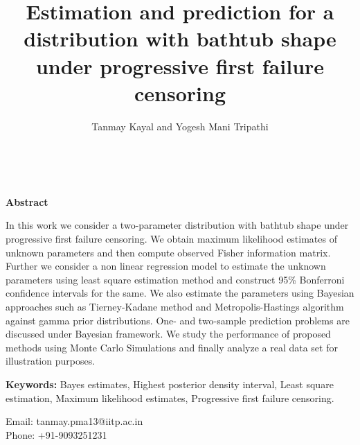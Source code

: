 \documentclass{article}
\begin{document}
\vspace{5cm}
\title
{\bf Estimation and prediction for a distribution with bathtub shape under progressive first failure censoring}

\author{Tanmay Kayal and Yogesh Mani Tripathi}
\date{}
\maketitle {}\\

 
 \begin{center}
 {\bf Abstract}
 \end{center}


In this work we consider a two-parameter distribution with bathtub shape under progressive first failure censoring. We obtain maximum likelihood estimates of unknown parameters and then compute observed Fisher information matrix. Further we consider a non linear regression model to estimate the unknown parameters using least square estimation method and construct 95\% Bonferroni confidence intervals for the same. We also estimate the parameters using Bayesian approaches such as Tierney-Kadane method and Metropolis-Hastings algorithm against gamma prior distributions. One- and two-sample prediction problems are discussed under Bayesian framework. We study the performance of proposed methods using Monte Carlo Simulations and finally analyze a real data set for illustration purposes.\\

 \vspace*{0.05in}
 
{\bf{Keywords:}} Bayes estimates, Highest posterior density interval, Least square estimation, Maximum likelihood estimates, Progressive first failure censoring.


 \vfill
 
Email: tanmay.pma13@iitp.ac.in\\

Phone: +91-9093251231
\end{document}

